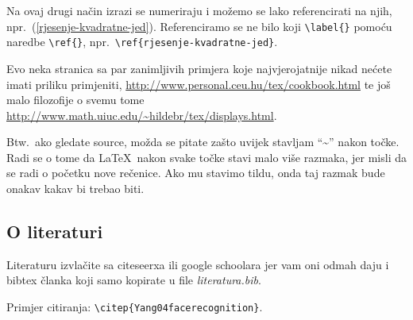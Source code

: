 \documentclass{article}
\begin{document}
Na ovaj drugi način izrazi se numeriraju i možemo se lako referencirati na
njih, npr.~(\ref{rjesenje-kvadratne-jed}). Referenciramo se ne bilo koji
\verb|\label{}| pomoću naredbe \verb|\ref{}|,
npr.~\verb|\ref{rjesenje-kvadratne-jed}|.

Evo neka stranica sa par zanimljivih primjera koje najvjerojatnije nikad nećete
imati priliku primjeniti, \url{http://www.personal.ceu.hu/tex/cookbook.html} te
još malo filozofije o svemu tome
\url{http://www.math.uiuc.edu/~hildebr/tex/displays.html}.

Btw.~ako gledate source, možda se pitate zašto uvijek stavljam ``\textasciitilde{}''
nakon točke. Radi se o tome da \LaTeX~nakon svake točke stavi malo više
razmaka, jer misli da se radi o početku nove rečenice. Ako mu stavimo tildu,
onda taj razmak bude onakav kakav bi trebao biti.

\subsection{O literaturi}
Literaturu izvlačite sa citeseerxa ili google schoolara jer vam oni odmah daju
i bibtex članka koji samo kopirate u file \emph{literatura.bib}.

Primjer citiranja: \verb|\citep{Yang04facerecognition}|.
\end{document}
